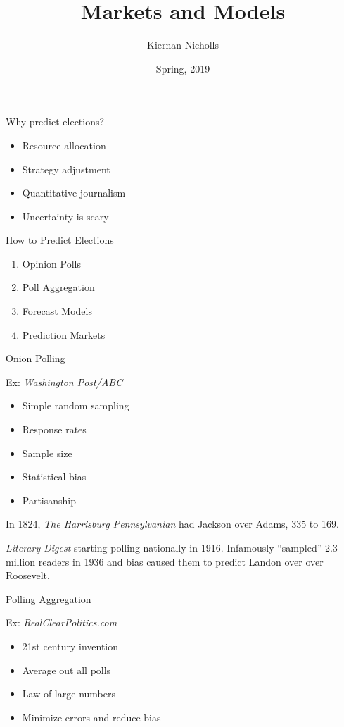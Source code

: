 \documentclass[
  ignorenonframetext,
]{beamer}
\title{Markets and Models}
\author{Kiernan Nicholls}
\date{Spring, 2019}
\providecommand{\tightlist}{%
  \setlength{\itemsep}{0pt}\setlength{\parskip}{0pt}}
\begin{document}
\frame{\titlepage}

\begin{frame}{Why predict elections?}
\protect\hypertarget{why-predict-elections}{}

\begin{itemize}
\tightlist
\item
  Resource allocation
\item
  Strategy adjustment
\item
  Quantitative journalism
\item
  Uncertainty is scary
\end{itemize}

\end{frame}

\begin{frame}{How to Predict Elections}
\protect\hypertarget{how-to-predict-elections}{}

\begin{enumerate}
\tightlist
\item
  Opinion Polls
\item
  Poll Aggregation
\item
  Forecast Models
\item
  Prediction Markets
\end{enumerate}

\end{frame}

\begin{frame}{Onion Polling}
\protect\hypertarget{onion-polling}{}

Ex: \emph{Washington Post/ABC}

\begin{itemize}
\tightlist
\item
  Simple random sampling
\item
  Response rates
\item
  Sample size
\item
  Statistical bias
\item
  Partisanship
\end{itemize}

In 1824, \emph{The Harrisburg Pennsylvanian} had Jackson over Adams, 335
to 169.

\emph{Literary Digest} starting polling nationally in 1916. Infamously
``sampled'' 2.3 million readers in 1936 and bias caused them to predict
Landon over over Roosevelt.

\end{frame}

\begin{frame}{Polling Aggregation}
\protect\hypertarget{polling-aggregation}{}

Ex: \emph{RealClearPolitics.com}

\begin{itemize}
\tightlist
\item
  21st century invention
\item
  Average out all polls
\item
  Law of large numbers
\item
  Minimize errors and reduce bias
\end{itemize}

\end{frame}
\end{document}
